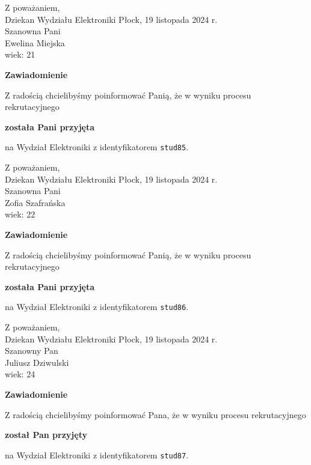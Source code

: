 \documentclass[12pt,a4paper]{article}
\begin{document}
\noindent
Z poważaniem,\\
Dziekan
Wydziału Elektroniki
\newpage
\hfill Płock, 19 listopada 2024 r.\\ 
\noindent 
Szanowna Pani \\
Ewelina Miejska \\
wiek: 21

\bigskip

\begin{center}
{\Large\textbf{Zawiadomienie}}
\end{center}
\bigskip
Z radością chcielibyśmy poinformować Panią, że w wyniku procesu rekrutacyjnego
\begin{center}
\textsf{\textbf{została Pani przyjęta}} 
\end{center}
na Wydział Elektroniki z identyfikatorem \verb|stud85|.
\vspace{2cm}

\noindent
Z poważaniem,\\
Dziekan
Wydziału Elektroniki
\newpage
\hfill Płock, 19 listopada 2024 r.\\ 
\noindent 
Szanowna Pani \\
Zofia Szafrańska \\
wiek: 22

\bigskip

\begin{center}
{\Large\textbf{Zawiadomienie}}
\end{center}
\bigskip
Z radością chcielibyśmy poinformować Panią, że w wyniku procesu rekrutacyjnego
\begin{center}
\textsf{\textbf{została Pani przyjęta}} 
\end{center}
na Wydział Elektroniki z identyfikatorem \verb|stud86|.
\vspace{2cm}

\noindent
Z poważaniem,\\
Dziekan
Wydziału Elektroniki
\newpage
\hfill Płock, 19 listopada 2024 r.\\ 
\noindent 
Szanowny Pan \\
Juliusz Dziwulski \\
wiek: 24

\bigskip

\begin{center}
{\Large\textbf{Zawiadomienie}}
\end{center}
\bigskip
Z radością chcielibyśmy poinformować Pana, że w wyniku procesu rekrutacyjnego
\begin{center}
\textsf{\textbf{został Pan przyjęty}} 
\end{center}
na Wydział Elektroniki z identyfikatorem \verb|stud87|.
\vspace{2cm}
\end{document}
